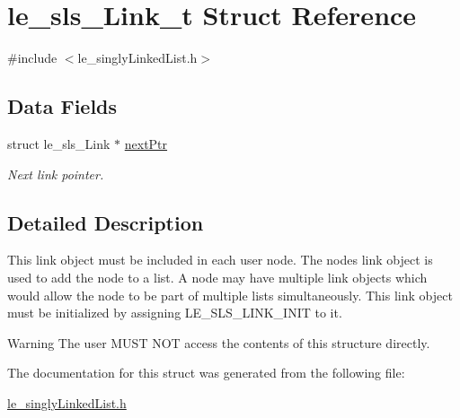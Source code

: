 \hypertarget{structle__sls___link__t}{}\section{le\+\_\+sls\+\_\+\+Link\+\_\+t Struct Reference}
\label{structle__sls___link__t}


{\ttfamily \#include $<$le\+\_\+singly\+Linked\+List.\+h$>$}

\subsection*{Data Fields}
\begin{DoxyCompactItemize}
\item 
struct le\+\_\+sls\+\_\+\+Link $\ast$ \hyperlink{structle__sls___link__t_ab3b10ba398661c42032ece7720860ee2}{next\+Ptr}\hypertarget{structle__sls___link__t_ab3b10ba398661c42032ece7720860ee2}{}\label{structle__sls___link__t_ab3b10ba398661c42032ece7720860ee2}

\begin{DoxyCompactList}\small\item\em Next link pointer. \end{DoxyCompactList}\end{DoxyCompactItemize}


\subsection{Detailed Description}
This link object must be included in each user node. The node\textquotesingle{}s link object is used to add the node to a list. A node may have multiple link objects which would allow the node to be part of multiple lists simultaneously. This link object must be initialized by assigning L\+E\+\_\+\+S\+L\+S\+\_\+\+L\+I\+N\+K\+\_\+\+I\+N\+IT to it.

\begin{DoxyWarning}{Warning}
The user M\+U\+ST N\+OT access the contents of this structure directly. 
\end{DoxyWarning}


The documentation for this struct was generated from the following file\+:\begin{DoxyCompactItemize}
\item 
\hyperlink{le__singly_linked_list_8h}{le\+\_\+singly\+Linked\+List.\+h}\end{DoxyCompactItemize}
